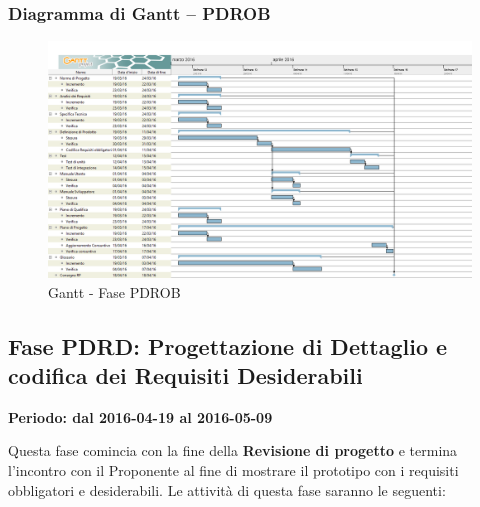\documentclass[../PianoProgetto.tex]{subfiles}
\begin{document}
		\subsubsection{Diagramma di Gantt – PDROB}
			\begin{figure}[!h]
				\centering
				\includegraphics[width=\textwidth]{gantt_png/4-requisiti_obbligatori}
				\caption{Gantt - Fase PDROB}
				\label{fig:Gantt - Fase PDROB}
			\end{figure}
\newpage
	\subsection{Fase PDRD: Progettazione di Dettaglio e codifica dei Requisiti Desiderabili}
		\textbf{Periodo: dal 2016-04-19 al 2016-05-09}
		
		Questa fase comincia con la fine della \textbf{Revisione di progetto} e termina l'incontro con il Proponente al fine di mostrare il prototipo con i requisiti obbligatori e desiderabili. Le attività di questa fase saranno le seguenti:
\end{document}
